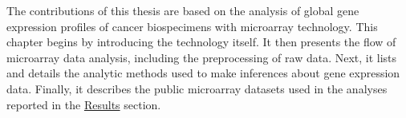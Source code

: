 The contributions of this thesis are based on the analysis of global gene
expression profiles of cancer biospecimens with microarray technology.  This
chapter begins by introducing the technology itself.  It then presents the flow
of microarray data analysis, including the preprocessing of raw data.  Next, it
lists and details the analytic methods used to make inferences about gene
expression data. Finally, it describes the public microarray datasets used in
the analyses reported in the \hyperref[chap:results]{\textsf{Results}} section.






